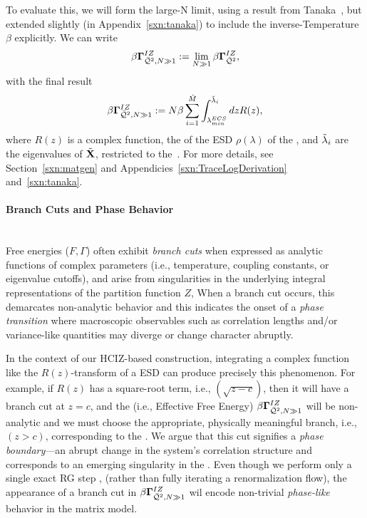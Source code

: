 
To evaluate this, we will form the large-N limit, using a result from Tanaka~\cite{Tanaka2007,Tanaka2008},
but extended slightly (in Appendix~\ref{sxn:tanaka}) to include the inverse-Temperature $\beta$ explicitly.
We can write
\begin{align}
  \label{eqn:izgin_def}
  \beta\mathbf{\Gamma}^{IZ}_{\bar{\mathcal{Q}}^{2},N\gg 1}:=\lim_{N\gg 1}\beta\mathbf{\Gamma}^{IZ}_{\bar{\mathcal{Q}}^{2}} ,
\end{align}
with the final result
  \begin{align}
    \label{eqn:hciz_tanaka}
    \beta\mathbf{\Gamma}^{IZ}_{\bar{\mathcal{Q}}^{2},N\gg 1}:=N\beta\sum_{i=1}^{\tilde{M}}\int^{\tilde{\lambda}_{i}}_{\lambda^{ECS}_{min}} dz R(z) ,
\end{align}
where $R(z)$ is a complex function, the \RTransform of the ESD $\rho(\lambda)$ of the \Teacher, and $\tilde{\lambda}_{i}$ are the eigenvalues of \Teacher \CorrelationMatrix $\tilde{\mathbf{X}}$, restricted to the~\ECS.
For more details, see Section~\ref{sxn:matgen} and Appendicies~\ref{sxn:TraceLogDerivation} and~\ref{sxn:tanaka}.

\paragraph{Branch Cuts and Phase Behavior}
 \\
Free energies ($F,\Gamma$)  often exhibit \emph{branch cuts} when expressed as analytic functions 
of complex parameters (i.e., temperature, coupling constants, or eigenvalue cutoffs),
and arise from singularities in the underlying integral representations of the partition function $Z$,
When a branch cut occurs, this demarcates non-analytic behavior
and this indicates the onset of a \emph{phase transition} where
macroscopic observables such as correlation lengths and/or variance-like quantities
may diverge or change character abruptly.  

In the context of our HCIZ-based construction, integrating a complex function like the $R(z)$-transform of
a \HeavyTailed ESD can produce precisely this phenomenon.
For example, if $R(z)$ has a square-root term, i.e., $(\sqrt{z-c})$, then it will have a branch cut at $z=c$,
and the \GeneratingFunction (i.e.,  Effective Free Energy) $\beta\mathbf{\Gamma}^{IZ}_{\bar{\mathcal{Q}}^{2},N\gg 1}$
will be non-analytic and we must choose the appropriate, physically meaningful branch, i.e., $(z>c)$,
corresponding to the \ECS.
We argue that this cut signifies a \emph{phase boundary}—an abrupt change
in the system’s correlation structure and corresponds to an emerging singularity in the \LayerQuality.
Even though we perform only a single exact RG step , 
(rather than fully iterating a renormalization flow), the appearance of a branch cut in $\beta\mathbf{\Gamma}^{IZ}_{\bar{\mathcal{Q}}^{2},N\gg 1}$ wil encode
non-trivial \emph{phase-like} behavior in the \SETOL \HeavyTailed matrix model.
